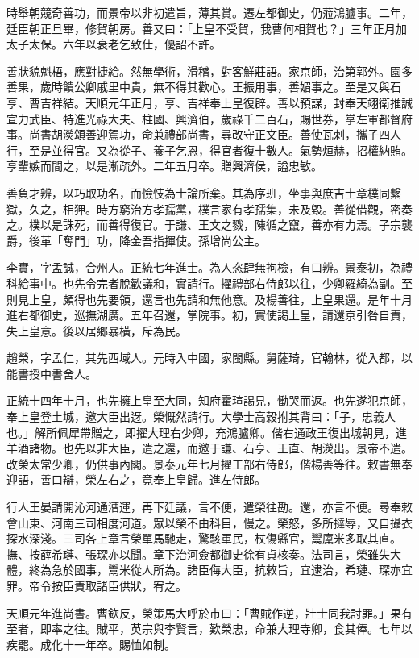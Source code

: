 \begin{pinyinscope}
時舉朝競奇善功，而景帝以非初遣旨，薄其賞。遷左都御史，仍蒞鴻臚事。二年，廷臣朝正旦畢，修賀朝房。善又曰：「上皇不受賀，我曹何相賀也？」三年正月加太子太保。六年以衰老乞致仕，優詔不許。

善狀貌魁梧，應對捷給。然無學術，滑稽，對客鮮莊語。家京師，治第郭外。園多善果，歲時饋公卿戚里中貴，無不得其歡心。王振用事，善媚事之。至是又與石亨、曹吉祥結。天順元年正月，亨、吉祥奉上皇復辟。善以預謀，封奉天翊衛推誠宣力武臣、特進光祿大夫、柱國、興濟伯，歲祿千二百石，賜世券，掌左軍都督府事。尚書胡濙頌善迎駕功，命兼禮部尚書，尋改守正文臣。善使瓦剌，攜子四人行，至是並得官。又為從子、養子乞恩，得官者復十數人。氣勢烜赫，招權納賄。亨輩嫉而間之，以是漸疏外。二年五月卒。贈興濟侯，謚忠敏。

善負才辨，以巧取功名，而憸忮為士論所棄。其為序班，坐事與庶吉士章樸同繫獄，久之，相狎。時方窮治方孝孺黨，樸言家有孝孺集，未及毀。善從借觀，密奏之。樸以是誅死，而善得復官。于謙、王文之戮，陳循之竄，善亦有力焉。子宗襲爵，後革「奪門」功，降金吾指揮使。孫增尚公主。

李實，字孟誠，合州人。正統七年進士。為人恣肆無拘檢，有口辨。景泰初，為禮科給事中。也先令完者脫歡議和，實請行。擢禮部右侍郎以往，少卿羅綺為副。至則見上皇，頗得也先要領，還言也先請和無他意。及楊善往，上皇果還。是年十月進右都御史，巡撫湖廣。五年召還，掌院事。初，實使謁上皇，請還京引咎自責，失上皇意。後以居鄉暴橫，斥為民。

趙榮，字孟仁，其先西域人。元時入中國，家閩縣。舅薩琦，官翰林，從入都，以能書授中書舍人。

正統十四年十月，也先擁上皇至大同，知府霍瑄謁見，慟哭而返。也先遂犯京師，奉上皇登土城，邀大臣出迓。榮慨然請行。大學士高穀拊其背曰：「子，忠義人也。」解所佩犀帶贈之，即擢大理右少卿，充鴻臚卿。偕右通政王復出城朝見，進羊酒諸物。也先以非大臣，遣之還，而邀于謙、石亨、王直、胡濙出。景帝不遣。改榮太常少卿，仍供事內閣。景泰元年七月擢工部右侍郎，偕楊善等往。敕書無奉迎語，善口辯，榮左右之，竟奉上皇歸。進左侍郎。

行人王晏請開沁河通漕運，再下廷議，言不便，遣榮往勘。還，亦言不便。尋奉敕會山東、河南三司相度河道。眾以榮不由科目，慢之。榮怒，多所撻辱，又自攝衣探水深淺。三司各上章言榮單馬馳走，驚駭軍民，杖傷縣官，鬻廩米多取其直。撫、按薛希璉、張琛亦以聞。章下治河僉都御史徐有貞核奏。法司言，榮雖失大體，終為急於國事，鬻米從人所為。諸臣侮大臣，抗敕旨，宜逮治，希璉、琛亦宜罪。帝令按臣責取諸臣供狀，宥之。

天順元年進尚書。曹欽反，榮策馬大呼於市曰：「曹賊作逆，壯士同我討罪。」果有至者，即率之往。賊平，英宗與李賢言，歎榮忠，命兼大理寺卿，食其俸。七年以疾罷。成化十一年卒。賜恤如制。


\end{pinyinscope}
